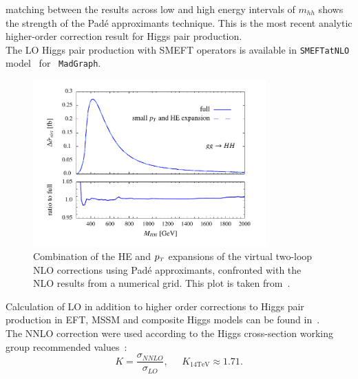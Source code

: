 matching between the results across low and high energy intervals of $m_{hh}$ shows the strength of the Pad\'e  approximants technique.  This is the most recent analytic higher-order correction result for Higgs pair production.\\
%
The LO Higgs pair production with SMEFT operators is available in \texttt{SMEFTatNLO} model~\cite{Degrande:2020evl} for ~\texttt{MadGraph}.

\begin{figure}[!htpb]
	\centering
	\includegraphics[width = 0.8\textwidth]{./figures/HH_NLO}
	\caption{Combination of the HE and $p_{\scriptscriptstyle T}$ expansions of the virtual two-loop NLO corrections using  Pad\'e  approximants,  confronted with the NLO results from a numerical grid. This plot is taken from~\cite{Bellafronte:2022jmo}. } 
	\label{dihiggs-gridplot}
\end{figure}
%
Calculation of LO in addition to higher order corrections to Higgs pair production in EFT, MSSM and composite Higgs models can be found in~\cite{Grober:2010yv,Grober:2014zva,Grober:2015cwa,Grober:2017gut,deFlorian:2017qfk,Buchalla:2018yce}.\\ 
The NNLO correction were used according to the Higgs cross-section working group recommended values~\cite{Dittmaier:2012vm,deFlorian:2016spz}:
\begin{equation}
	K = \frac{\sigma_{NNLO}}{\sigma_{LO}}, \;\;\;\;\; K_{14 \mathrm{TeV}} \approx 1.71.
\end{equation}
